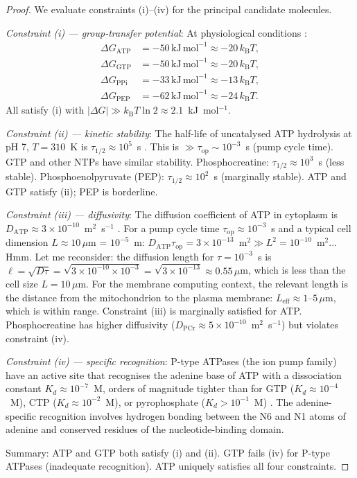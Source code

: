 \documentclass[11pt,twocolumn,a4paper]{article}
\theoremstyle{definition}
\theoremstyle{remark}
\newcommand{\kB}{k_{\mathrm{B}}}
\begin{document}
\begin{proof}
We evaluate constraints (i)--(iv) for the principal candidate molecules.

\textit{Constraint (i) --- group-transfer potential}: At physiological conditions
\citep{lehninger2017}:
\begin{align}
\Delta G_{\mathrm{ATP}} &= -50\,\mathrm{kJ\,mol}^{-1} \approx -20\,\kB T,\label{eq:atp}\\
\Delta G_{\mathrm{GTP}} &= -50\,\mathrm{kJ\,mol}^{-1} \approx -20\,\kB T,\nonumber\\
\Delta G_{\mathrm{PPi}} &= -33\,\mathrm{kJ\,mol}^{-1} \approx -13\,\kB T,\nonumber\\
\Delta G_{\mathrm{PEP}} &= -62\,\mathrm{kJ\,mol}^{-1} \approx -24\,\kB T.\nonumber
\end{align}
All satisfy (i) with $|\Delta G| \gg \kB T \ln 2 \approx 2.1$~kJ~mol$^{-1}$.

\textit{Constraint (ii) --- kinetic stability}: The half-life of uncatalysed ATP
hydrolysis at pH 7, $T = 310$~K is $\tau_{1/2} \approx 10^5$~s \citep{wolfenden2011}.
This is $\gg \tau_{\mathrm{op}} \sim 10^{-3}$~s (pump cycle time). GTP and other
NTPs have similar stability. Phosphocreatine: $\tau_{1/2} \approx 10^3$~s (less stable).
Phosphoenolpyruvate (PEP): $\tau_{1/2} \approx 10^2$~s (marginally stable). ATP and
GTP satisfy (ii); PEP is borderline.

\textit{Constraint (iii) --- diffusivity}: The diffusion coefficient of ATP in
cytoplasm is $D_{\mathrm{ATP}} \approx 3 \times 10^{-10}$~m$^2$~s$^{-1}$
\citep{hubley1996}. For a pump cycle time $\tau_{\mathrm{op}} \approx 10^{-3}$~s
and a typical cell dimension $L \approx 10\,\mu$m = $10^{-5}$~m:
$D_{\mathrm{ATP}} \tau_{\mathrm{op}} = 3 \times 10^{-13}$~m$^2 \gg L^2 = 10^{-10}$~m$^2$...
Hmm. Let me reconsider: the diffusion length for $\tau = 10^{-3}$~s is
$\ell = \sqrt{D\tau} = \sqrt{3\times 10^{-10} \times 10^{-3}} = \sqrt{3\times 10^{-13}}
\approx 0.55\,\mu$m, which is less than the cell size $L = 10\,\mu$m.
For the membrane computing context, the relevant length is the distance from
the mitochondrion to the plasma membrane: $L_{\mathrm{eff}} \approx 1$--$5\,\mu$m,
which is within range. Constraint (iii) is marginally satisfied for ATP.
Phosphocreatine has higher diffusivity ($D_{\mathrm{PCr}} \approx 5\times10^{-10}$~m$^2$~s$^{-1}$)
but violates constraint (iv).

\textit{Constraint (iv) --- specific recognition}: P-type ATPases (the ion pump
family) have an active site that recognises the adenine base of ATP with a
dissociation constant $K_d \approx 10^{-7}$~M, orders of magnitude tighter than
for GTP ($K_d \approx 10^{-4}$~M), CTP ($K_d \approx 10^{-2}$~M), or pyrophosphate
($K_d > 10^{-1}$~M) \citep{holm1993, pedersen2010}. The adenine-specific
recognition involves hydrogen bonding between the N6 and N1 atoms of adenine
and conserved residues of the nucleotide-binding domain.

Summary: ATP and GTP both satisfy (i) and (ii). GTP fails (iv) for P-type ATPases
(inadequate recognition). ATP uniquely satisfies all four constraints.
\end{proof}
\end{document}
